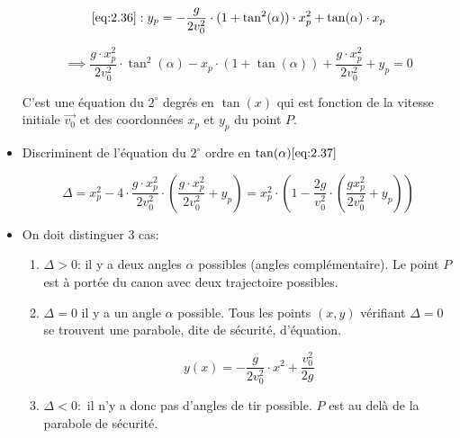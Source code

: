 \documentclass[
    11pt,
    a4paper,
    oneside,
    headinlcude, footinclude,
    twoside,
]{report}
\renewcommand{\vec}[1]{\overrightarrow{#1}}
\begin{document}
\begin{itemize}
$$ \eqref{eq:2.36}: y_{p} = -\frac{g}{2 v_{0}^{2}} \cdot (1 + \tan^{2}(\alpha))
\cdot x_{p}^{2} + \tan(\alpha) \cdot x_{p}$$

\begin{equation}
\label{eq:2.37}
\implies \frac{g \cdot x_{p}^{2}}{2 v_{0}^{2}} \cdot \tan^{2}(\alpha)
- x_{p} \cdot (1 + \tan(\alpha)) + \frac{g \cdot x_{p}^{2}}{2
v_{0}^{2}} + y_{p} = 0
\end{equation}

C'est une équation du $2^\circ$ degrés en $\tan(x)$ qui est fonction
de la vitesse initiale $\vec{v_{0}}$ et des coordonnées $x_{p}$ et $y_{p}$ du
point $P$.

\item Discriminent de l'équation du $2^{\circ}$ ordre en $\tan(\alpha) \eqref{eq:2.37}$ 

\begin{equation}
\Delta  = x_{p}^{2} - 4 \cdot \frac{g \cdot x_{p}^{2}}{2 v_{0}^{2}}
\cdot \left( \frac{g \cdot x_{p}^{2}}{2 v_{0}^{2}} + y_{p}\right)
= x_{p}^{2} \cdot \left( 1 - \frac{2g}{v_{0}^{2}} \cdot \left(
\frac{g x_{p}^{2}}{2 v_{0}^{2}} + y_{p}\right)\right)
\end{equation}

\item On doit distinguer 3 cas:

\begin{enumerate}
\item $\Delta > 0$: il y a deux angles $\alpha$ possibles (angles
complémentaire). Le point $P$ est à portée du canon avec deux
trajectoire possibles.

\item $\Delta = 0$  il y a un angle $\alpha$ possible. Tous les
points $(x, y)$ vérifiant $\Delta = 0$ se trouvent une
parabole, dite de sécurité, d'équation.

\begin{equation}
\label{eq:2.39}
y (x) = - \frac{g}{2v_{0}^{2}} \cdot x^{2} + \frac{v_{0}^{2}}{2g}
\end{equation}

\item $\Delta < 0:$ il n'y a donc pas d'angles de tir possible. $P$
est au delà de la parabole de sécurité.
\end{enumerate}
\end{itemize}
\end{document}

